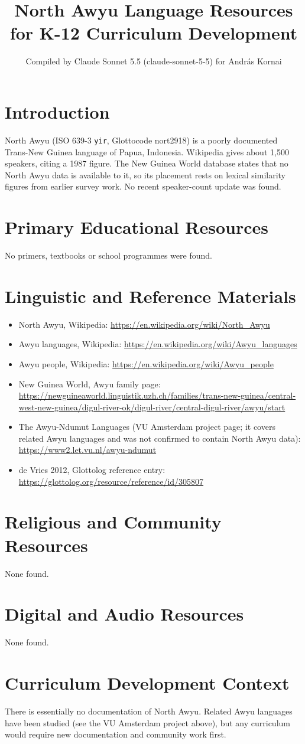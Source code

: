 \documentclass[12pt]{article}
\title{North Awyu Language Resources for K-12 Curriculum Development}
\author{Compiled by Claude Sonnet 5.5 (claude-sonnet-5-5) for Andr\'as Kornai}
\date{}
\begin{document}
\maketitle

\section{Introduction}
North Awyu (ISO 639-3 \texttt{yir}, Glottocode nort2918) is a poorly documented Trans-New Guinea language of Papua, Indonesia. Wikipedia gives about 1,500 speakers, citing a 1987 figure. The New Guinea World database states that no North Awyu data is available to it, so its placement rests on lexical similarity figures from earlier survey work. No recent speaker-count update was found.

\section{Primary Educational Resources}
No primers, textbooks or school programmes were found.

\section{Linguistic and Reference Materials}
\begin{itemize}
\item North Awyu, Wikipedia: \url{https://en.wikipedia.org/wiki/North_Awyu}
\item Awyu languages, Wikipedia: \url{https://en.wikipedia.org/wiki/Awyu_languages}
\item Awyu people, Wikipedia: \url{https://en.wikipedia.org/wiki/Awyu_people}
\item New Guinea World, Awyu family page: \url{https://newguineaworld.linguistik.uzh.ch/families/trans-new-guinea/central-west-new-guinea/digul-river-ok/digul-river/central-digul-river/awyu/start}
\item The Awyu-Ndumut Languages (VU Amsterdam project page; it covers related Awyu languages and was not confirmed to contain North Awyu data): \url{https://www2.let.vu.nl/awyu-ndumut}
\item de Vries 2012, Glottolog reference entry: \url{https://glottolog.org/resource/reference/id/305807}
\end{itemize}

\section{Religious and Community Resources}
None found.

\section{Digital and Audio Resources}
None found.

\section{Curriculum Development Context}
There is essentially no documentation of North Awyu. Related Awyu languages have been studied (see the VU Amsterdam project above), but any curriculum would require new documentation and community work first.
\end{document}
